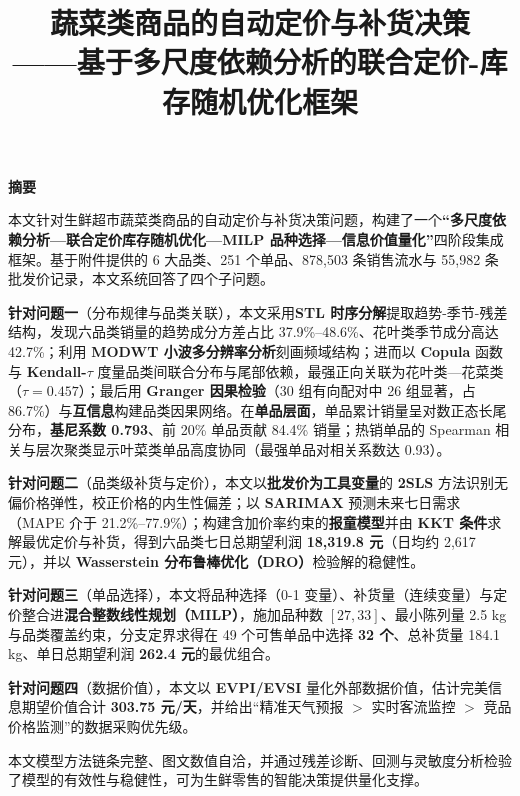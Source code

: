 \documentclass[UTF8,fontset=none,a4paper,11pt]{ctexart}
\title{\vspace{-1.2cm}\textbf{\sffamily 蔬菜类商品的自动定价与补货决策}\\[2pt]
\large\sffamily ——基于多尺度依赖分析的联合定价-库存随机优化框架}
\author{}
\date{}
\begin{document}
\maketitle
\thispagestyle{fancy}
\vspace{-1.6cm}

\begin{center}\textbf{\large\sffamily 摘\quad 要}\end{center}
\noindent
本文针对生鲜超市蔬菜类商品的自动定价与补货决策问题，构建了一个\textbf{“多尺度依赖分析—联合定价库存随机优化—MILP 品种选择—信息价值量化”}四阶段集成框架。基于附件提供的 6 大品类、251 个单品、878{,}503 条销售流水与 55{,}982 条批发价记录，本文系统回答了四个子问题。

\noindent\textbf{针对问题一}（分布规律与品类关联），本文采用\textbf{STL 时序分解}提取趋势-季节-残差结构，发现六品类销量的趋势成分方差占比 37.9\%--48.6\%、花叶类季节成分高达 42.7\%；利用 \textbf{MODWT 小波多分辨率分析}刻画频域结构；进而以 \textbf{Copula} 函数与 \textbf{Kendall-$\tau$} 度量品类间联合分布与尾部依赖，最强正向关联为花叶类—花菜类（$\tau=0.457$）；最后用 \textbf{Granger 因果检验}（30 组有向配对中 26 组显著，占 86.7\%）与\textbf{互信息}构建品类因果网络。在\textbf{单品层面}，单品累计销量呈对数正态长尾分布，\textbf{基尼系数 0.793}、前 20\% 单品贡献 84.4\% 销量；热销单品的 Spearman 相关与层次聚类显示叶菜类单品高度协同（最强单品对相关系数达 0.93）。

\noindent\textbf{针对问题二}（品类级补货与定价），本文以\textbf{批发价为工具变量}的 \textbf{2SLS} 方法识别无偏价格弹性，校正价格的内生性偏差；以 \textbf{SARIMAX} 预测未来七日需求（MAPE 介于 21.2\%--77.9\%）；构建含加价率约束的\textbf{报童模型}并由 \textbf{KKT 条件}求解最优定价与补货，得到六品类七日总期望利润 \textbf{18{,}319.8 元}（日均约 2{,}617 元），并以 \textbf{Wasserstein 分布鲁棒优化（DRO）}检验解的稳健性。

\noindent\textbf{针对问题三}（单品选择），本文将品种选择（0-1 变量）、补货量（连续变量）与定价整合进\textbf{混合整数线性规划（MILP）}，施加品种数 $[27,33]$、最小陈列量 2.5 kg 与品类覆盖约束，分支定界求得在 49 个可售单品中选择 \textbf{32 个}、总补货量 184.1 kg、单日总期望利润 \textbf{262.4 元}的最优组合。

\noindent\textbf{针对问题四}（数据价值），本文以 \textbf{EVPI/EVSI} 量化外部数据价值，估计完美信息期望价值合计 \textbf{303.75 元/天}，并给出“精准天气预报 $>$ 实时客流监控 $>$ 竞品价格监测”的数据采购优先级。

\noindent 本文模型方法链条完整、图文数值自洽，并通过残差诊断、回测与灵敏度分析检验了模型的有效性与稳健性，可为生鲜零售的智能决策提供量化支撑。
\end{document}
